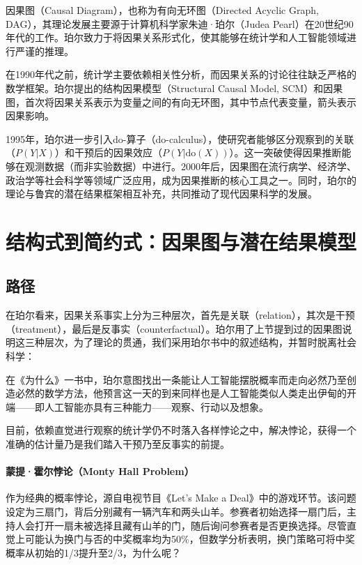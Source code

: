 因果图（Causal Diagram），也称为有向无环图（Directed Acyclic Graph, DAG），其理论发展主要源于计算机科学家朱迪·珀尔（Judea Pearl）在20世纪90年代的工作。珀尔致力于将因果关系形式化，使其能够在统计学和人工智能领域进行严谨的推理。

在1990年代之前，统计学主要依赖相关性分析，而因果关系的讨论往往缺乏严格的数学框架。珀尔提出的结构因果模型（Structural Causal Model, SCM）和因果图，首次将因果关系表示为变量之间的有向无环图，其中节点代表变量，箭头表示因果影响。

1995年，珀尔进一步引入do-算子（do-calculus），使研究者能够区分观察到的关联（\(P(Y|X)\)）和干预后的因果效应（\(P(Y|\mathrm{do}(X))\)）。这一突破使得因果推断能够在观测数据（而非实验数据）中进行。2000年后，因果图在流行病学、经济学、政治学等社会科学等领域广泛应用，成为因果推断的核心工具之一。同时，珀尔的理论与鲁宾的潜在结果框架相互补充，共同推动了现代因果科学的发展。

\section{结构式到简约式：因果图与潜在结果模型}

\subsection{路径}

在珀尔看来，因果关系事实上分为三种层次，首先是关联（relation），其次是干预（treatment），最后是反事实（counterfactual）。珀尔用了上节提到过的因果图说明这三种层次，为了理论的贯通，我们采用珀尔书中的叙述结构，并暂时脱离社会科学：

在《为什么》一书中，珀尔意图找出一条能让人工智能摆脱概率而走向必然乃至创造必然的数学方法，他预言这一天的到来同样也是人工智能类似人类走出伊甸的开端——即人工智能亦具有三种能力——观察、行动以及想象。

目前，依赖直觉进行观察的统计学仍不时落入各样悖论之中，解决悖论，获得一个准确的估计量乃是我们踏入干预乃至反事实的前提。

\paragraph*{蒙提·霍尔悖论（Monty Hall Problem）}作为经典的概率悖论，源自电视节目《Let's Make a Deal》中的游戏环节。该问题设定为三扇门，背后分别藏有一辆汽车和两头山羊。参赛者初始选择一扇门后，主持人会打开一扇未被选择且藏有山羊的门，随后询问参赛者是否更换选择。尽管直觉上可能认为换门与否的中奖概率均为50\%，但数学分析表明，换门策略可将中奖概率从初始的1/3提升至2/3，为什么呢？

